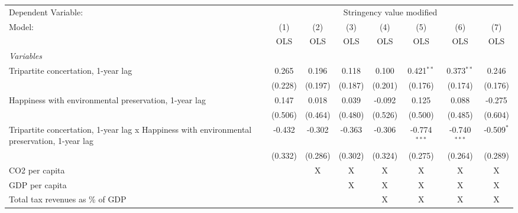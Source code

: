 
\begingroup
\centering
\begin{tabular}{lccccccc}
   \toprule
   Dependent Variable: & \multicolumn{7}{c}{Stringency value modified}\\
   Model:                                                                                      & (1)     & (2)     & (3)     & (4)     & (5)            & (6)            & (7)\\  
                                                                                               &  OLS    & OLS     & OLS     & OLS     & OLS            & OLS            & OLS\\  
   \midrule
   \emph{Variables}\\
   Tripartite concertation, 1-year lag                                                         & 0.265   & 0.196   & 0.118   & 0.100   & 0.421$^{**}$   & 0.373$^{**}$   & 0.246\\   
                                                                                               & (0.228) & (0.197) & (0.187) & (0.201) & (0.176)        & (0.174)        & (0.176)\\   
   Happiness with environmental preservation, 1-year lag                                       & 0.147   & 0.018   & 0.039   & -0.092  & 0.125          & 0.088          & -0.275\\   
                                                                                               & (0.506) & (0.464) & (0.480) & (0.526) & (0.500)        & (0.485)        & (0.604)\\   
   Tripartite concertation, 1-year lag x Happiness with environmental preservation, 1-year lag & -0.432  & -0.302  & -0.363  & -0.306  & -0.774$^{***}$ & -0.740$^{***}$ & -0.509$^{*}$\\   
                                                                                               & (0.332) & (0.286) & (0.302) & (0.324) & (0.275)        & (0.264)        & (0.289)\\   
   CO2 per capita                                                                              &         & X       & X       & X       & X              & X              & X\\  
   GDP per capita                                                                              &         &         & X       & X       & X              & X              & X\\  
   Total tax revenues as \% of GDP                                                             &         &         &         & X       & X              & X              & X\\  

\end{tabular}
